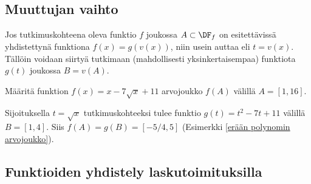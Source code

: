 \subsection*{Muuttujan vaihto}

Jos tutkimuskohteena oleva funktio $f$ joukossa $A\subset\DF_f$ on esitettävissä
yhdistettynä funktiona $f(x)=g(v(x))$, niin usein auttaa  eli
 $t=v(x)$. Tällöin voidaan siirtyä tutkimaan (mahdollisesti yksinkertaisempaa)
funktiota $g(t)$ joukossa $B=v(A)$.
\begin{Exa} Määritä funktion $f(x)=x-7\sqrt{x}+11$ arvojoukko $f(A)$ välillä $A=[1,16]$.
\end{Exa}
\ratk Sijoituksella $t=\sqrt{x}$ tutkimuskohteeksi tulee funktio $g(t)=t^2-7t+11$ välillä
$B=[1,4]$. Siis $f(A)=g(B)=[-5/4,5]$ (Esimerkki \ref{erään polynomin arvojoukko}). \loppu


\subsection*{Funktioiden yhdistely laskutoimituksilla}

